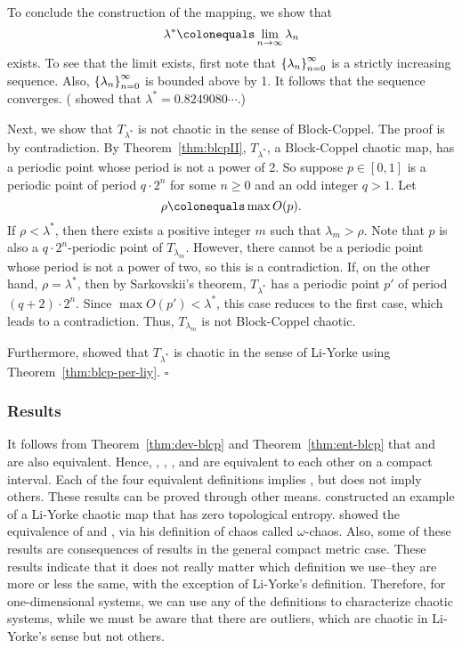 \documentclass[10pt,twoside,draft]{book}
\begin{document}
\begin{example}
To conclude the construction of the mapping, we show that
\begin{equation*}
  \lambda^* \ceq \lim\limits_{n \to \infty} \lambda_n
\end{equation*}
exists.
To see that the limit exists, first note that $\left \{ \lambda_n \right \}^{\infty}_{n = 0}$ is a strictly increasing sequence.
Also, $\left \{ \lambda_n \right \}^{\infty}_{n = 0}$ is bounded above by 1.
It follows that the sequence converges.
(\citet{misiurewicz1} showed that $\lambda^* = 0.8249080 \cdots$.)

Next, we show that $T_{\lambda^*}$ is not chaotic in the sense of Block-Coppel.
The proof is by contradiction.
By Theorem~\ref{thm:blcpII}, $T_{\lambda^*}$, a Block-Coppel chaotic map, has a periodic point whose period is not a power of 2.
So suppose $p \in [0,1]$ is a periodic point of period $q\cdot 2^n$ for some $n \geq 0$ and an odd integer $q > 1$.
Let 
\begin{equation*}
  \rho \ceq \max O(p).
\end{equation*}
If $\rho < \lambda^*$, then there exists a positive integer $m$ such that $\lambda_m > \rho$.
Note that $p$ is also a $q\cdot 2^n$-periodic point of $T_{\lambda_m}$.
However, there cannot be a periodic point whose period is not a power of two, so this is a contradiction.
If, on the other hand, $\rho = \lambda^*$, then by Sarkovskii's theorem, $T_{\lambda^*}$ has a periodic point $p'$ of period $(q+2)\cdot 2^n$.
Since $\max O(p') < \lambda^*$, this case reduces to the first case, which leads to a contradiction.
Thus, $T_{\lambda_m}$ is not Block-Coppel chaotic.

Furthermore, \citet[p.146]{blockcoppel} showed that $T_{\lambda^*}$ is chaotic in the sense of Li-Yorke using Theorem~\ref{thm:blcp-per-liy}. $\square$
\label{eg:counterexample}
\end{example}

\subsubsection*{Results}
It follows from Theorem~\ref{thm:dev-blcp} and Theorem~\ref{thm:ent-blcp} that \dev and \akm are also equivalent.
Hence, \dev, \wig, \blcp, and \akm are equivalent to each other on a compact interval.
Each of the four equivalent definitions implies \liy, but \liy does not imply others.
These results can be proved through other means.
\citet{smital} constructed an example of a Li-Yorke chaotic map that has zero topological entropy.
\citet{omegachaos} showed the equivalence of \dev and \akm, via his definition of chaos called $\omega$-chaos.
Also, some of these results are consequences of results in the general compact metric case.
These results indicate that it does not really matter which definition we use--they are more or less the same, with the exception of Li-Yorke's definition.
Therefore, for one-dimensional systems, we can use any of the definitions to characterize chaotic systems, while we must be aware that there are outliers, which are chaotic in Li-Yorke's sense but not others.
\end{document}
